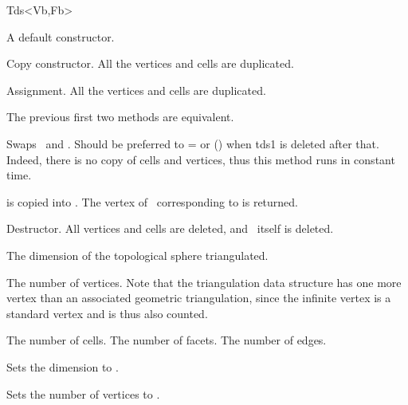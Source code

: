 \begin{ccClassTemplate}{Tds<Vb,Fb>}
\ccGlue
{}

\ccCreation
{}

\ccConstructor{\ccClassName();}
{A default constructor.}

{Copy constructor. All the vertices and cells are duplicated.}

{Assignment. All the vertices and cells are duplicated.}

The previous first two methods are equivalent.

{Swaps \ccVar\ and . Should be preferred to \ccVar=
or \ccVar() when tds1 is deleted after that. Indeed, there is no
copy of cells and vertices, thus this method runs in constant time.}

{ is copied into \ccVar. The vertex of \ccVar\ 
corresponding to  is returned.
}

{Destructor. All vertices and cells are deleted, and \ccVar\ itself is
deleted.} 

\ccAccessFunctions

{The dimension of the topological sphere triangulated.}

{The number of vertices. Note that the triangulation data structure has one
more vertex than an associated geometric triangulation, since the
infinite vertex is a standard vertex and is thus also counted.}

{The number of cells.
}
\ccGlue
{}
{The number of facets.
}
\ccGlue
{}
{The number of edges.
}

{Sets the dimension to .}

{Sets the number of vertices to \ccc{n}.}


\end{ccClassTemplate}
